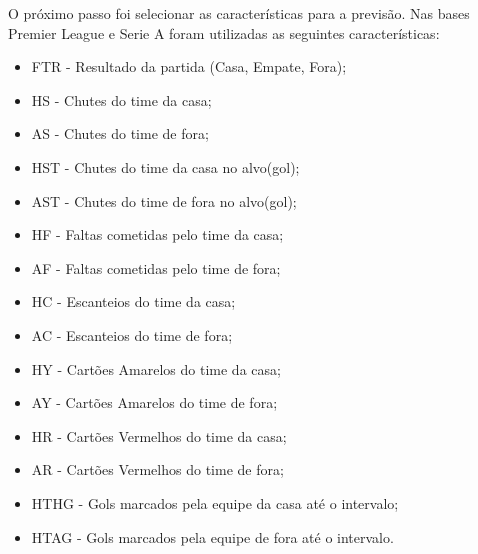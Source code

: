 	O próximo passo foi selecionar as características para a previsão. Nas bases Premier League e Serie A foram utilizadas as seguintes características:
	\begin{itemize}
	\item FTR - Resultado da partida (Casa, Empate, Fora);
	\item HS - Chutes do time da casa;
	\item AS - Chutes do time de fora;
	\item HST - Chutes do time da casa no alvo(gol);
	\item AST - Chutes do time de fora no alvo(gol);
	\item HF - Faltas cometidas pelo time da casa;
	\item AF - Faltas cometidas pelo time de fora;
	\item HC - Escanteios do time da casa;
	\item AC - Escanteios do time de fora;
	\item HY - Cartões Amarelos do time da casa;
	\item AY - Cartões Amarelos do time de fora;
	\item HR - Cartões Vermelhos do time da casa;
	\item AR - Cartões Vermelhos do time de fora;
	\item HTHG - Gols marcados pela equipe da casa até o intervalo;
	\item HTAG - Gols marcados pela equipe de fora até o intervalo.
	\end{itemize}
	
